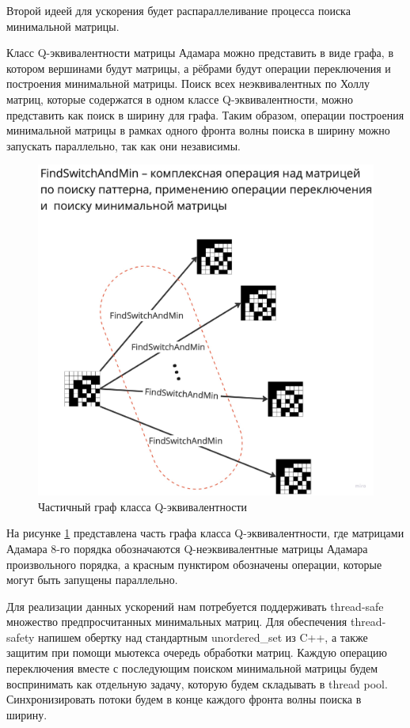 \documentclass[a4paper, 14pt]{extreport}
\begin{document}
Второй идеей для ускорения будет распараллеливание процесса поиска минимальной матрицы.

Класс Q-эквивалентности матрицы Адамара можно представить в виде графа, в котором вершинами будут матрицы, а рёбрами будут операции переключения и построения минимальной матрицы. Поиск всех неэквивалентных по Холлу матриц, которые содержатся в одном классе Q-эквивалентности, можно представить как поиск в ширину для графа. Таким образом, операции построения минимальной матрицы в рамках одного фронта волны поиска в ширину можно запускать параллельно, так как они независимы.

\begin{figure}[h]
    \centering
    \includegraphics[scale=0.18]{img/graph.jpg}
    \caption{Частичный граф класса Q-эквивалентности}
    \label{fig:graph}
\end{figure}

На рисунке \ref{fig:graph} представлена часть графа класса Q-эквивалентности, где матрицами Адамара 8-го порядка обозначаются Q-неэквивалентные матрицы Адамара произвольного порядка, а красным пунктиром обозначены операции, которые могут быть запущены параллельно.

Для реализации данных ускорений нам потребуется поддерживать thread-safe множество предпросчитанных минимальных матриц. Для обеспечения thread-safety напишем обертку над стандартным unordered\_set из C++, а также защитим при помощи мьютекса очередь обработки матриц. Каждую операцию переключения вместе с последующим поиском минимальной матрицы будем воспринимать как отдельную задачу, которую будем складывать в thread pool. Синхронизировать потоки будем в конце каждого фронта волны поиска в ширину.
\end{document}
